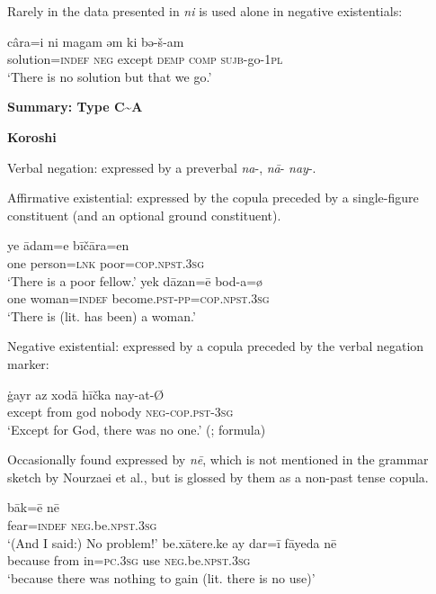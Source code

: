 ﻿\documentclass[output=paper]{langsci/langscibook}
\begin{document}
\begin{unindented}
Rarely in the data presented in \citealt{Paul2011} \textit{ni} is used alone in negative existentials:
%
\begin{exe}\ex
    \gll câra=i ni magam əm ki bə-š-am \\
solution=\textsc{indef} \textsc{neg} except \textsc{demp} \textsc{comp} \textsc{sujb}-go-\textsc{1pl} \\
    \glt `There is no solution but that we go.' \citep[214]{Paul2011}  
    \end{exe}

\textbf{Summary: Type C{\textasciitilde}A}

\textbf{Koroshi} \parencite{NourzaeiJahani2015}

Verbal negation: expressed by a preverbal \textit{na}-, \textit{nā}- \textit{nay}-.

Affirmative existential: expressed by the copula preceded by a single-figure constituent (and an optional ground constituent). 
%
\begin{exe}\ex \gll ye ādam=e bīčāra=en \\
one person=\textsc{lnk}   poor=\textsc{cop.npst.3sg} \\
    \glt `There is a poor fellow.' \parencite[31]{NourzaeiJahani2015}
\ex \gll yek dāzan=ē bod-a=ø \\
one woman=\textsc{indef} become.\textsc{pst-pp=cop.npst.3sg} \\
    \glt `There is (lit. has been) a woman.' \parencite[90]{NourzaeiJahani2015}
    \end{exe} 
%
Negative existential: expressed by a copula preceded by the verbal negation marker: 
%
\begin{exe}\ex \gll ġayr az xodā hīčka nay-at-Ø \\
except from god   nobody \textsc{neg-cop.pst-3sg} \\
    \glt `Except for God, there was no one.'
(\citealt[123]{NourzaeiJahani2015}; formula)
    \end{exe}
%
Occasionally found expressed by \textit{nē}, which is not mentioned in the grammar sketch by Nourzaei et al., but is glossed by them as a non-past tense copula.
%
\begin{exe}\ex \gll bāk=ē nē \\
fear=\textsc{indef}    \textsc{neg}.be.\textsc{npst.3sg} \\
    \glt `(And I said:) No problem!' \parencite[149]{NourzaeiJahani2015}
\ex \gll be.xātere.ke ay dar=ī fāyeda nē \\
because from in=\textsc{pc}.\textsc{3sg} use \textsc{neg}.be.\textsc{npst.3sg} \\
    \glt `because there was nothing to gain (lit. there is no use)'
\parencite[144]{NourzaeiJahani2015}
    \end{exe}


\end{unindented}
\end{document}
